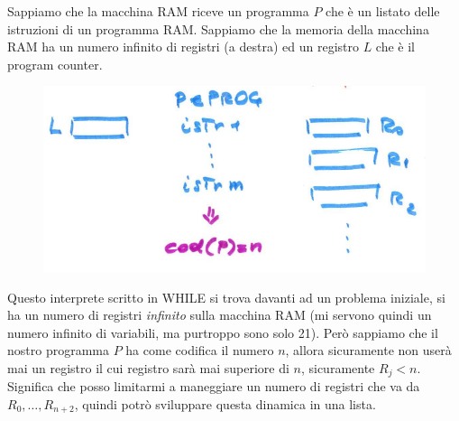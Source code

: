 \documentclass{article}
\begin{document}
Sappiamo che la macchina RAM riceve un programma $P$ che è un listato delle istruzioni di un programma
RAM. Sappiamo che la memoria della macchina RAM ha un numero infinito di registri
(a destra) ed un registro $L$ che è il program counter.
\begin{figure}[H]
    \centering
    \includegraphics[scale=0.5]{images/interprete_while_ram.png}
\end{figure}
Questo interprete scritto in WHILE si trova davanti ad un problema iniziale, si ha un
numero di registri \textit{infinito} sulla macchina RAM (mi servono quindi un
numero infinito di variabili, ma purtroppo sono solo 21). Però sappiamo che il
nostro programma $P$ ha come codifica il numero $n$, allora sicuramente non userà
mai un registro il cui registro sarà mai superiore di $n$, sicuramente $R_j<n$. Significa
che posso limitarmi a maneggiare un numero di registri che va da $R_0,\dots,R_{n+2}$,
quindi potrò sviluppare questa dinamica in una lista.
\end{document}
